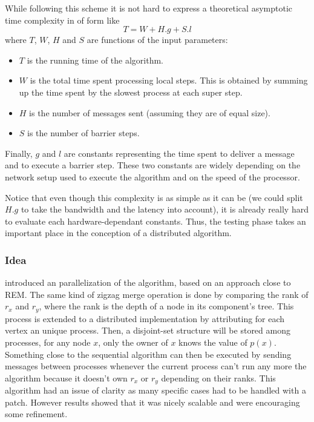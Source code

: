 \documentclass[12px]{article}
\begin{document}
        While following this scheme it is not hard to express a theoretical asymptotic time complexity in of form like
          \[ T = W + H.g + S.l \]
        where $T$, $W$, $H$ and $S$ are functions of the input parameters:
          \begin{itemize}
            \item $T$ is the running time of the algorithm.
            \item $W$ is the total time spent processing local steps. This is obtained by summing up the time spent by the slowest process at each super step.
            \item $H$ is the number of messages sent (assuming they are of equal size).
            \item $S$ is the number of barrier steps.
          \end{itemize}
        Finally, $g$ and $l$ are constants representing the time spent to deliver a message and to execute a barrier step. These two constants are widely depending on the network setup used to execute the algorithm and on the speed of the processor.

        Notice that even though this complexity is as simple as it can be (we could split $H.g$ to take the bandwidth and the latency into account), it is already really hard to evaluate each hardware-dependant constants. Thus, the testing phase takes an important place in the conception of a distributed algorithm.

      \subsubsection{Idea}
         introduced an parallelization of the algorithm, based on an approach close to REM\@.
        The same kind of zigzag merge operation is done by comparing the rank of $r_x$ and $r_y$, where the rank is the depth of a node in its component's tree.
        This process is extended to a distributed implementation by attributing for each vertex an unique process. Then, a disjoint-set structure will be stored among processes, for any node $x$, only the owner of $x$ knows the value of $p(x)$.
        Something close to the sequential algorithm can then be executed by sending messages between processes whenever the current process can't run any more the algorithm because it doesn't own $r_x$ or $r_y$ depending on their ranks.
        This algorithm had an issue of clarity as many specific cases had to be handled with a patch. However results showed that it was nicely scalable and were encouraging some refinement.
\end{document}
